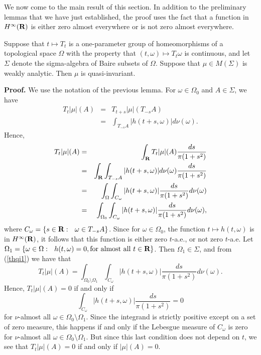 We now come to the main result of this section.  In addition to the 
preliminary lemmas that we have just established, the proof 
uses the fact that a function in $H^\infty(\R)$ is either zero almost
everywhere or is not zero almost everywhere.
\begin{thqi}
Suppose that $t\mapsto T_t$ is a one-parameter 
group of homeomorphisms of a topological space $\Omega$ 
with the property that $(t,\omega)\mapsto T_t\omega$ 
is continuous, and let $\Sigma$ denote the sigma-algebra of 
Baire subsets of $\Omega$.  Suppose that $\mu\in M(\Sigma)$ 
is weakly analytic.  Then $\mu$ is quasi-invariant.
\label{thqi}
\end{thqi}
{\bf Proof.}  We use the notation of the previous lemma.  
For $\omega\in\Omega_0$ and $A\in\Sigma$, we have
\begin{eqnarray}
T_t|\mu|(A)     &=&     T_{t+s}|\mu| \left( T_{-s}A\right)
			\nonumber \\
		&=&     \int_{T_{-s} A} |h(t+s,\omega)|d\nu(\omega) .
			\nonumber 
\end{eqnarray}
Hence,
\begin{eqnarray}
T_t|\mu|(A)     &=&     \int_\R T_t|\mu|(A) \frac{ds}{\pi(1+s^2)}
			\nonumber \\
		&=&     
\int_\R \int_{T_{-s} A} |h(t+s,\omega)|d\nu(\omega)\frac{ds}{\pi(1+s^2)}
			\nonumber \\
		&=&     
\int_\Omega \int_{C_\omega}|h(t+s,\omega)|
\frac{ds}{\pi(1+s^2)}d\nu(\omega)
			\nonumber \\
		&=&     
\int_{\Omega_0} \int_{C_\omega}|h(t+s,\omega)|
\frac{ds}{\pi(1+s^2)}d\nu(\omega),                
\label{thqi1}
\end{eqnarray}
where $C_\omega=\{s\in\R:\ \ \omega\in T_{-s}A\}$.  
Since for $\omega\in\Omega_0$, the function 
$t\mapsto h(t,\omega)$ is in $H^\infty(\R)$, it 
follows that this function is either zero $t$-a.e., or 
not zero $t$-a.e.  Let 
$\Omega_1=\{\omega\in\Omega:\ \ h(t,\omega)=0, 
{\rm for\ almost\ all}\ t\in\R\}$.  
Then 
$\Omega_1\in\Sigma$, and from (\ref{thqi1}) we have that
\begin{equation}
T_t|\mu|(A)=\int_{\Omega_0\setminus\Omega_1} 
\int_{C_\omega}|h(t+s,\omega)|\frac{ds}{\pi(1+s^2)}d\nu(\omega).
\label{thqi2}
\end{equation}
Hence, $T_t|\mu|(A)=0$ if and only if 
$$\int_{C_\omega}|h(t+s,\omega)|\frac{ds}{\pi(1+s^2)}=0$$
for $\nu$-almost all $\omega\in \Omega_0\setminus\Omega_1$.  
Since the integrand is strictly positive except on a set of zero measure, 
this happens 
if and only if the Lebesgue measure of $C_\omega$ is zero for 
$\nu$-almost all $\omega\in \Omega_0\setminus\Omega_1$.  
But since this last condition does not depend on $t$, we see 
that $T_t|\mu|(A)=0$ if and only if $|\mu|(A)=0$.

